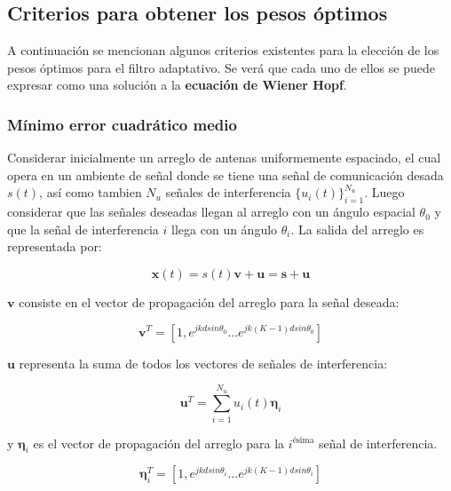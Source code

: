 \subsection{Criterios para obtener los pesos óptimos}

A continuación se mencionan algunos criterios existentes para la elección de los pesos óptimos para el filtro adaptativo. Se verá que cada uno de ellos se puede expresar como una solución a la \textbf{ecuación de Wiener Hopf}.

\subsubsection{Mínimo error cuadrático medio}

Considerar inicialmente un arreglo de antenas uniformemente espaciado, el cual opera en un ambiente de señal donde se tiene una señal de comunicación desada $s(t)$, así como tambien $N_u$ señales de interferencia $\{u_i(t)\}^{N_u}_{i=1}$. Luego considerar que las señales deseadas llegan al arreglo con un ángulo espacial $\theta_0$ y que la señal de interferencia $i$ llega con un ángulo $\theta_i$. La salida del arreglo es representada por:

\begin{equation}
\mathbf{x}(t) = s(t) \mathbf{v} + \mathbf{u} = \mathbf{s} + \mathbf{u}
\end{equation}

$\mathbf{v}$ consiste en el vector de propagación del arreglo para la señal deseada:

\begin{equation}
\mathbf{v}^T = [1,e^{j k d sin \theta_0} ... e^{j k (K-1) d sin \theta_0}]
\end{equation}

$\mathbf{u}$ representa la suma de todos los vectores de señales de interferencia:

\begin{equation}
\mathbf{u}^T = \sum_{i=1}^{N_u} u_i(t) \boldsymbol\eta_i
\end{equation}

y $\boldsymbol\eta_i$ es el vector de propagación del arreglo para la $i^{\text{ésima}}$ señal de interferencia.

\begin{equation}
\boldsymbol\eta_i^T = [1, e^{j k d sin \theta_i} ... e^{j k (K-1) d sin \theta_i}]
\end{equation}

